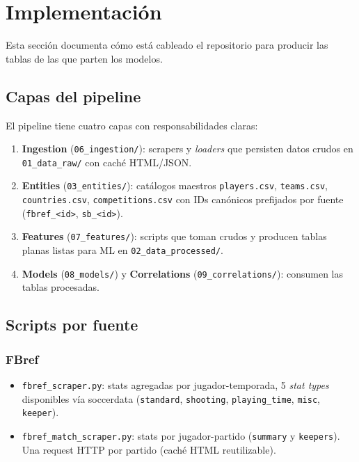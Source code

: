 \section{Implementación}
\label{sec:impl}

Esta sección documenta cómo está cableado el repositorio para producir las tablas de las que parten los modelos.

\subsection{Capas del pipeline}

El pipeline tiene cuatro capas con responsabilidades claras:

\begin{enumerate}[label=\textbf{L\arabic*.}]
  \item \textbf{Ingestion} (\texttt{06\_ingestion/}): scrapers y \emph{loaders} que persisten datos crudos en \texttt{01\_data\_raw/} con caché HTML/JSON.
  \item \textbf{Entities} (\texttt{03\_entities/}): catálogos maestros \texttt{players.csv}, \texttt{teams.csv}, \texttt{countries.csv}, \texttt{competitions.csv} con IDs canónicos prefijados por fuente (\texttt{fbref\_<id>}, \texttt{sb\_<id>}).
  \item \textbf{Features} (\texttt{07\_features/}): scripts que toman crudos y producen tablas planas listas para ML en \texttt{02\_data\_processed/}.
  \item \textbf{Models} (\texttt{08\_models/}) y \textbf{Correlations} (\texttt{09\_correlations/}): consumen las tablas procesadas.
\end{enumerate}

\subsection{Scripts por fuente}

\subsubsection{FBref}

\begin{itemize}[noitemsep]
  \item \texttt{fbref\_scraper.py}: stats agregadas por jugador-temporada, 5 \emph{stat types} disponibles vía soccerdata (\texttt{standard}, \texttt{shooting}, \texttt{playing\_time}, \texttt{misc}, \texttt{keeper}).
  \item \texttt{fbref\_match\_scraper.py}: stats por jugador-partido (\texttt{summary} y \texttt{keepers}). Una request HTTP por partido (caché HTML reutilizable).
\end{itemize}

